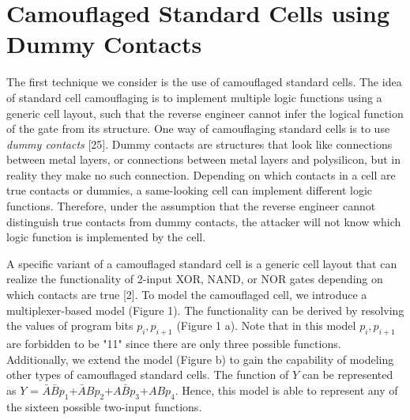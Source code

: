 \documentclass[proposal]{umassthesis}  %
\begin{document}
\section{Camouflaged Standard Cells using Dummy Contacts}
The first technique we consider is the use of camouflaged standard cells. The idea of standard cell camouflaging is to implement multiple logic functions using a generic cell layout, such that the reverse engineer cannot infer the logical function of the gate from its structure. One way of camouflaging standard cells is to use \textit{dummy contacts} [25]. Dummy contacts are structures that look like connections between metal layers, or connections between metal layers and polysilicon, but in reality they make no such connection. Depending on which contacts in a cell are true contacts or dummies, a same-looking cell can implement different logic functions. Therefore, under the assumption that the reverse engineer cannot distinguish true contacts from dummy contacts, the attacker will not know which logic function is implemented by the cell.

A specific variant of a camouflaged standard cell is a generic cell layout that can realize the functionality of 2-input XOR, NAND, or NOR gates depending on which contacts are true [2]. To model the camouflaged cell, we introduce a multiplexer-based model (Figure 1). The functionality can be derived by resolving the values of program bits $p_{i},p_{i+1}$ (Figure 1 a). Note that in this model $p_{i},p_{i+1}$ are forbidden to be "11" since there are only three possible functions. Additionally, we extend the model (Figure b) to gain the capability of modeling other types of camouflaged standard cells. The function of $Y$ can be represented as $Y$ = $\bar{A}\bar{B}p_{1}$+$\bar{A}Bp_{2}$+$A\bar{B}p_{3}$+$ABp_{4}$. Hence, this model is able to represent any of the sixteen possible two-input functions. 

















\end{document}
